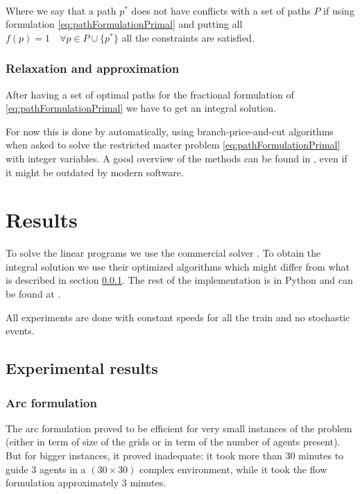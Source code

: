 \documentclass[14pt,a4paper]{article}
\theoremstyle{definition}
\numberwithin{equation}{subsection}
\begin{document}
$ $\\

Where we say that a path $p^*$ does not have conflicts with a set of paths $P$ if using formulation \eqref{eq:pathFormulationPrimal} and putting all $f(p) = 1 \quad \forall p\in P \cup \{p^*\}$ all the constraints are satisfied.



\subsubsection{Relaxation and approximation}
\label{relaxation}

After having a set of optimal paths for the fractional formulation of \eqref{eq:pathFormulationPrimal} we have to get an integral solution.

For now this is done by \cite{gurobi} automatically, using branch-price-and-cut algorithms when asked to solve the restricted master problem \eqref{eq:pathFormulationPrimal} with integer variables. A good overview of the methods can be found in \cite{BranchAndCut}, even if it might be outdated by modern software.





\newpage
\section{Results}

To solve the linear programs we use the commercial solver \cite{gurobi}. To obtain the integral solution we use their optimized algorithms which might differ from what is described in section \ref{relaxation}. The rest of the implementation is in Python and can be found at \cite{GIT}.


All experiments are done with constant speeds for all the train and no stochastic events.

\label{results}
\subsection{Experimental results}
\label{results:arcsVSflow}

\subsubsection{Arc formulation}

The arc formulation proved to be efficient for very small instances of the problem (either in term of size of the grids or in term of the number of agents present). But for bigger instances, it proved inadequate: it took more than 30 minutes to guide 3 agents in a  $(30 \times 30)$ complex environment, while it took the flow formulation approximately 3 minutes.
\end{document}
